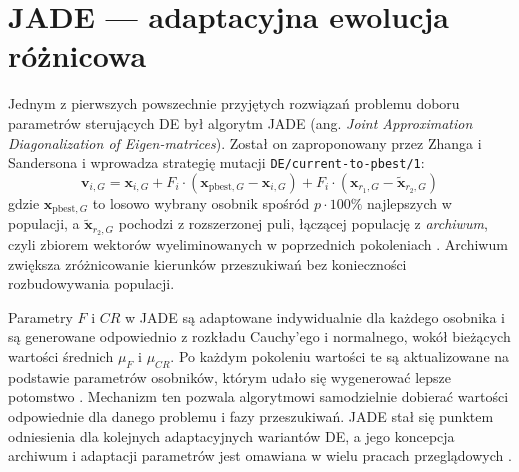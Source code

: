 \section{JADE --- adaptacyjna ewolucja różnicowa} \label{sec:jade}

Jednym z pierwszych powszechnie przyjętych rozwiązań problemu doboru parametrów sterujących DE był algorytm JADE (ang. \textit{Joint Approximation Diagonalization of Eigen-matrices}). Został on zaproponowany przez Zhanga i Sandersona \cite{Zhang2009JADE} i wprowadza strategię mutacji \texttt{DE/current-to-pbest/1}:
\[
\mathbf{v}_{i,G} = \mathbf{x}_{i,G} + F_i \cdot (\mathbf{x}_{\mathrm{pbest},G} - \mathbf{x}_{i,G}) + F_i \cdot (\mathbf{x}_{r_1,G} - \tilde{\mathbf{x}}_{r_2,G})
\]
gdzie $\mathbf{x}_{\mathrm{pbest},G}$ to losowo wybrany osobnik spośród $p \cdot 100\%$ najlepszych w populacji, a $\tilde{\mathbf{x}}_{r_2,G}$ pochodzi z rozszerzonej puli, łączącej populację z \textit{archiwum}, czyli zbiorem wektorów wyeliminowanych w poprzednich pokoleniach \cite{Zhang2009JADE}. Archiwum zwiększa zróżnicowanie kierunków przeszukiwań bez konieczności rozbudowywania populacji.

Parametry $F$ i $CR$ w JADE są adaptowane indywidualnie dla każdego osobnika i są generowane odpowiednio z rozkładu Cauchy'ego i normalnego, wokół bieżących wartości średnich $\mu_F$ i $\mu_{CR}$. Po każdym pokoleniu wartości te są aktualizowane na podstawie parametrów osobników, którym udało się wygenerować lepsze potomstwo \cite{Zhang2009JADE}. Mechanizm ten pozwala algorytmowi samodzielnie dobierać wartości odpowiednie dla danego problemu i fazy przeszukiwań. JADE stał się punktem odniesienia dla kolejnych adaptacyjnych wariantów DE, a jego koncepcja archiwum i adaptacji parametrów jest omawiana w wielu pracach przeglądowych \cite{Bilal2020}.

